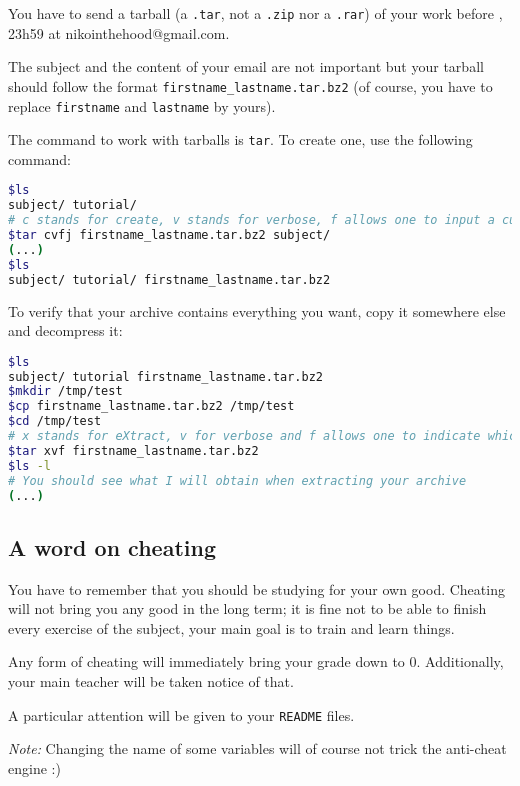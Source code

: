 \documentclass[12pt]{article}
\begin{document}
You have to send a tarball (a \texttt{.tar}, not a \texttt{.zip} nor a \texttt{.rar}) of your work before , 23h59 at nikointhehood@gmail.com.

The subject and the content of your email are not important but your tarball should follow the format \texttt{firstname\_lastname.tar.bz2} (of course, you have to replace \texttt{firstname} and \texttt{lastname} by yours).

The command to work with tarballs is \texttt{tar}. To create one, use the following command:

\begin{lstlisting}[language=bash]
$ls
subject/ tutorial/
# c stands for create, v stands for verbose, f allows one to input a custom name for the archive and j indicates the usage of bzip2
$tar cvfj firstname_lastname.tar.bz2 subject/
(...)
$ls
subject/ tutorial/ firstname_lastname.tar.bz2
\end{lstlisting}

To verify that your archive contains everything you want, copy it somewhere else and decompress it:

\begin{lstlisting}[language=bash]
$ls
subject/ tutorial firstname_lastname.tar.bz2
$mkdir /tmp/test
$cp firstname_lastname.tar.bz2 /tmp/test
$cd /tmp/test
# x stands for eXtract, v for verbose and f allows one to indicate which file tar should work with
$tar xvf firstname_lastname.tar.bz2
$ls -l
# You should see what I will obtain when extracting your archive
(...)
\end{lstlisting}
\subsection{A word on cheating}

You have to remember that you should be studying for your own good. Cheating will not bring you any good in the long term; it is fine not to be able to finish every exercise of the subject, your main goal is to train and learn things.

Any form of cheating will immediately bring your grade down to 0. Additionally, your main teacher will be taken notice of that.

A particular attention will be given to your \texttt{README} files.

\textit{Note:} Changing the name of some variables will of course not trick the anti-cheat engine :)
\end{document}
